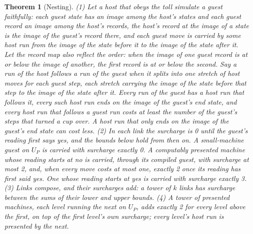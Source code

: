 \documentclass[11pt,twoside]{article}
\theoremstyle{thielethm}
\newtheorem{theorem}{Theorem}[section]
\theoremstyle{thieledef}
\theoremstyle{thieledef}
\theoremstyle{thieledef}
\theoremstyle{thielethm}
\theoremstyle{thieleobs}
\theoremstyle{thielethm}
\begin{document}
\begin{theorem}[Nesting]\label{thm:parts-nesting}
(1) Let a host that obeys the toll simulate a guest faithfully: each guest state has an image among
the host's states and each guest record an image among the host's records, the host's record at the
image of a state is the image of the guest's record there, and each guest move is carried by some
host run from the image of the state before it to the image of the state after it. Let the record
map also reflect the order: when the image of one guest record is at or below the image of another,
the first record is at or below the second. Say a run of the host \emph{follows} a run of the guest when it splits into one stretch of
host moves for each guest step, each stretch carrying the image of the state before that step to
the image of the state after it. Every run of the guest has a host run that follows it, every
such host run ends on the image of the guest's end state, and every host run that follows a guest
run costs at least the number of the guest's steps that turned a cup over. A host run that only
ends on the image of the guest's end state can cost less. (2) In each link the surcharge is 0 until the guest's reading first says yes, and the bounds below hold from then on. A small-machine guest on $U_P$ is carried with
surcharge exactly 0. A computably presented machine whose reading starts at no is carried, through
its compiled guest, with surcharge at most 2, and, when every move costs at most one, exactly 2
once its reading has first said yes. One whose reading starts at yes is carried with
surcharge exactly 3. (3) Links compose, and their surcharges add: a tower of
$k$ links has surcharge between the sums of their lower and upper bounds.
(4) A tower of presented machines, each level running the next on $U_P$, adds exactly 2 for every level above the first, on top of the first level's own surcharge; every level's host run is presented by the next. \end{theorem}
\end{document}
